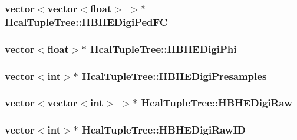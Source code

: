 \subsubsection[{H\+B\+H\+E\+Digi\+Ped\+F\+C}]{\setlength{\rightskip}{0pt plus 5cm}vector$<$vector$<$float$>$ $>$$\ast$ Hcal\+Tuple\+Tree\+::\+H\+B\+H\+E\+Digi\+Ped\+F\+C}\label{class_hcal_tuple_tree_a75ddbcd15a6c3c15370257f4e18f93dc}
\hypertarget{class_hcal_tuple_tree_a4465ac5c76bde5c83e2c0440e94377e6}{}
\subsubsection[{H\+B\+H\+E\+Digi\+Phi}]{\setlength{\rightskip}{0pt plus 5cm}vector$<$float$>$$\ast$ Hcal\+Tuple\+Tree\+::\+H\+B\+H\+E\+Digi\+Phi}\label{class_hcal_tuple_tree_a4465ac5c76bde5c83e2c0440e94377e6}
\hypertarget{class_hcal_tuple_tree_aa12edf8c843903084ea22da932cea02b}{}
\subsubsection[{H\+B\+H\+E\+Digi\+Presamples}]{\setlength{\rightskip}{0pt plus 5cm}vector$<$int$>$$\ast$ Hcal\+Tuple\+Tree\+::\+H\+B\+H\+E\+Digi\+Presamples}\label{class_hcal_tuple_tree_aa12edf8c843903084ea22da932cea02b}
\hypertarget{class_hcal_tuple_tree_a7bffd95bc16723e633cfe233e57f21b6}{}
\subsubsection[{H\+B\+H\+E\+Digi\+Raw}]{\setlength{\rightskip}{0pt plus 5cm}vector$<$vector$<$int$>$ $>$$\ast$ Hcal\+Tuple\+Tree\+::\+H\+B\+H\+E\+Digi\+Raw}\label{class_hcal_tuple_tree_a7bffd95bc16723e633cfe233e57f21b6}
\hypertarget{class_hcal_tuple_tree_a79e823d5bf62909c8bebc784f6a8ceb9}{}
\subsubsection[{H\+B\+H\+E\+Digi\+Raw\+I\+D}]{\setlength{\rightskip}{0pt plus 5cm}vector$<$int$>$$\ast$ Hcal\+Tuple\+Tree\+::\+H\+B\+H\+E\+Digi\+Raw\+I\+D}\label{class_hcal_tuple_tree_a79e823d5bf62909c8bebc784f6a8ceb9}
\hypertarget{class_hcal_tuple_tree_acbd3f4798c9bd4c991a537d4658eb96e}{}
